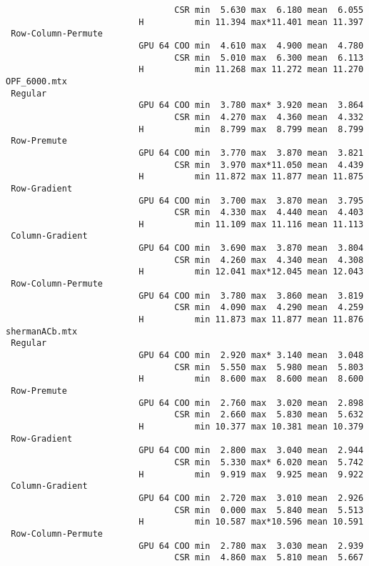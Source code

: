 {\begin{verbatim}
                                 CSR min  5.630 max  6.180 mean  6.055
                          H          min 11.394 max*11.401 mean 11.397
 Row-Column-Permute
                          GPU 64 COO min  4.610 max  4.900 mean  4.780
                                 CSR min  5.010 max  6.300 mean  6.113
                          H          min 11.268 max 11.272 mean 11.270
OPF_6000.mtx
 Regular
                          GPU 64 COO min  3.780 max* 3.920 mean  3.864
                                 CSR min  4.270 max  4.360 mean  4.332
                          H          min  8.799 max  8.799 mean  8.799
 Row-Premute
                          GPU 64 COO min  3.770 max  3.870 mean  3.821
                                 CSR min  3.970 max*11.050 mean  4.439
                          H          min 11.872 max 11.877 mean 11.875
 Row-Gradient
                          GPU 64 COO min  3.700 max  3.870 mean  3.795
                                 CSR min  4.330 max  4.440 mean  4.403
                          H          min 11.109 max 11.116 mean 11.113
 Column-Gradient
                          GPU 64 COO min  3.690 max  3.870 mean  3.804
                                 CSR min  4.260 max  4.340 mean  4.308
                          H          min 12.041 max*12.045 mean 12.043
 Row-Column-Permute
                          GPU 64 COO min  3.780 max  3.860 mean  3.819
                                 CSR min  4.090 max  4.290 mean  4.259
                          H          min 11.873 max 11.877 mean 11.876
shermanACb.mtx
 Regular
                          GPU 64 COO min  2.920 max* 3.140 mean  3.048
                                 CSR min  5.550 max  5.980 mean  5.803
                          H          min  8.600 max  8.600 mean  8.600
 Row-Premute
                          GPU 64 COO min  2.760 max  3.020 mean  2.898
                                 CSR min  2.660 max  5.830 mean  5.632
                          H          min 10.377 max 10.381 mean 10.379
 Row-Gradient
                          GPU 64 COO min  2.800 max  3.040 mean  2.944
                                 CSR min  5.330 max* 6.020 mean  5.742
                          H          min  9.919 max  9.925 mean  9.922
 Column-Gradient
                          GPU 64 COO min  2.720 max  3.010 mean  2.926
                                 CSR min  0.000 max  5.840 mean  5.513
                          H          min 10.587 max*10.596 mean 10.591
 Row-Column-Permute
                          GPU 64 COO min  2.780 max  3.030 mean  2.939
                                 CSR min  4.860 max  5.810 mean  5.667

\end{verbatim}}
